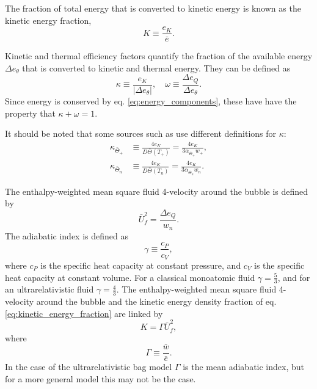 The fraction of total energy that is converted to kinetic energy is known as the kinetic energy fraction,
\begin{equation}
K \equiv \frac{e_K}{\bar{e}}.
\label{eq:kinetic_energy_fraction}
\end{equation}

Kinetic and thermal efficiency factors quantify the fraction of the available energy $\Delta e_\theta$ that is converted to kinetic and thermal energy.
They can be defined as
\begin{equation}
\kappa \equiv \frac{e_K}{| \Delta e_\theta |}, \quad
\omega \equiv \frac{\Delta e_Q}{\Delta e_\theta}.
\label{eq:kappa_omega}
\end{equation}
Since energy is conserved by eq. \eqref{eq:energy_components},
these have have the property that $\kappa + \omega = 1$.

It should be noted that some sources such as \cites[eq. 36]{giese_2020}[eq. 12, 14]{giese_2021}
use different definitions for $\kappa$:
\begin{align}
\kappa_{\bar{\Theta}_+} &\equiv \frac{4 e_K}{D \bar{\Theta}(T_+)} = \frac{4 e_K}{3 \alpha_{\bar{\Theta}_+} w_+},
\label{eq:kappa_thetabar_plus} \\
\kappa_{\bar{\Theta}_n} &\equiv \frac{4 e_K}{D \bar{\Theta}(T_n)} = \frac{4 e_K}{3 \alpha_{\bar{\Theta}_n} w_n}.
\label{eq:kappa_thetabar_n}
\end{align}

The enthalpy-weighted mean square fluid 4-velocity around the bubble is defined by
\begin{equation}
\bar{U}_f^2 = \frac{\Delta e_Q}{w_n}.
\label{eq:ubarf2}
\end{equation}
The adiabatic index is defined as
\begin{equation}
\gamma \equiv \frac{c_P}{c_V},
\end{equation}
where $c_P$ is the specific heat capacity at constant pressure,
and $c_V$ is the specific heat capacity at constant volume.
For a classical monoatomic fluid $\gamma = \frac{5}{3}$,
and for an ultrarelativistic fluid $\gamma = \frac{4}{3}$.
The enthalpy-weighted mean square fluid 4-velocity around the bubble and the kinetic energy density fraction of eq. \eqref{eq:kinetic_energy_fraction} are linked by
\begin{equation}
K = \Gamma \bar{U}_f^2,
\label{eq:kinetic_energy_fraction2}
\end{equation}
where
\begin{equation}
\Gamma \equiv \frac{\bar{w}}{\bar{e}}.
\label{eq:mean_adiabatic_index}
\end{equation}
In the case of the ultrarelativistic bag model $\Gamma$ is the mean adiabatic index,
but for a more general model this may not be the case.

